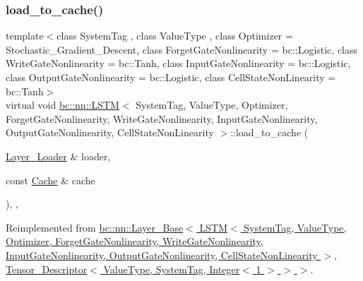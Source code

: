 \subsubsection{\texorpdfstring{load\+\_\+to\+\_\+cache()}{load\_to\_cache()}}
{\footnotesize\ttfamily template$<$class System\+Tag , class Value\+Type , class Optimizer  = Stochastic\+\_\+\+Gradient\+\_\+\+Descent, class Forget\+Gate\+Nonlinearity  = bc\+::\+Logistic, class Write\+Gate\+Nonlinearity  = bc\+::\+Tanh, class Input\+Gate\+Nonlinearity  = bc\+::\+Logistic, class Output\+Gate\+Nonlinearity  = bc\+::\+Logistic, class Cell\+State\+Non\+Linearity  = bc\+::\+Tanh$>$ \\
virtual void \hyperlink{structbc_1_1nn_1_1LSTM}{bc\+::nn\+::\+L\+S\+TM}$<$ System\+Tag, Value\+Type, Optimizer, Forget\+Gate\+Nonlinearity, Write\+Gate\+Nonlinearity, Input\+Gate\+Nonlinearity, Output\+Gate\+Nonlinearity, Cell\+State\+Non\+Linearity $>$\+::load\+\_\+to\+\_\+cache (\begin{DoxyParamCaption}\item[{\hyperlink{structbc_1_1nn_1_1Layer__Loader}{Layer\+\_\+\+Loader} \&}]{loader,  }\item[{const \hyperlink{structbc_1_1nn_1_1Cache}{Cache} \&}]{cache }\end{DoxyParamCaption})\hspace{0.3cm}{\ttfamily [inline]}, {\ttfamily [override]}, {\ttfamily [virtual]}}



Reimplemented from \hyperlink{structbc_1_1nn_1_1Layer__Base_a6f479e0d594eca051dff122cdb3fe2a1}{bc\+::nn\+::\+Layer\+\_\+\+Base$<$ L\+S\+T\+M$<$ System\+Tag, Value\+Type, Optimizer, Forget\+Gate\+Nonlinearity, Write\+Gate\+Nonlinearity, Input\+Gate\+Nonlinearity, Output\+Gate\+Nonlinearity, Cell\+State\+Non\+Linearity $>$, Tensor\+\_\+\+Descriptor$<$ Value\+Type, System\+Tag, Integer$<$ 1 $>$ $>$ $>$}.

\mbox{\label{structbc_1_1nn_1_1LSTM_a5351e27bb23773b3daa2376ab525d207}} 
